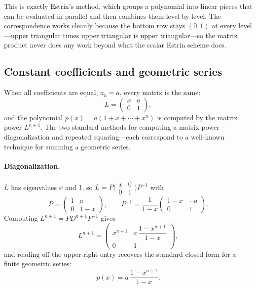 \documentclass{article}
\begin{document}
This is exactly Estrin's method, which groups a polynomial into linear pieces that can be evaluated in parallel and then combines them level by level. The correspondence works cleanly because the bottom row stays $(0, 1)$ at every level---upper triangular times upper triangular is upper triangular---so the matrix product never does any work beyond what the scalar Estrin scheme does.

\subsection*{Constant coefficients and geometric series}

When all coefficients are equal, $a_k = a$, every matrix is the same:
\begin{equation}
  L = \begin{pmatrix} x & a \\ 0 & 1 \end{pmatrix},
\end{equation}
and the polynomial $p(x) = a(1 + x + \cdots + x^n)$ is computed by the matrix power $L^{n+1}$. The two standard methods for computing a matrix power---diagonalization and repeated squaring---each correspond to a well-known technique for summing a geometric series.

\paragraph{Diagonalization.}
$L$ has eigenvalues $x$ and $1$, so $L = P \bigl(\begin{smallmatrix} x & 0 \\ 0 & 1 \end{smallmatrix}\bigr) P^{-1}$ with
\begin{equation}
  P = \begin{pmatrix} 1 & a \\ 0 & 1-x \end{pmatrix}, \qquad
  P^{-1} = \frac{1}{1-x}\begin{pmatrix} 1-x & -a \\ 0 & 1 \end{pmatrix}.
\end{equation}
Computing $L^{n+1} = P D^{n+1} P^{-1}$ gives
\begin{equation}
  L^{n+1} = \begin{pmatrix} x^{n+1} & a\,\dfrac{1-x^{n+1}}{1-x} \\[6pt] 0 & 1 \end{pmatrix},
\end{equation}
and reading off the upper-right entry recovers the standard closed form for a finite geometric series:
\begin{equation}
  p(x) = a\,\frac{1 - x^{n+1}}{1-x}.
\end{equation}
\end{document}
